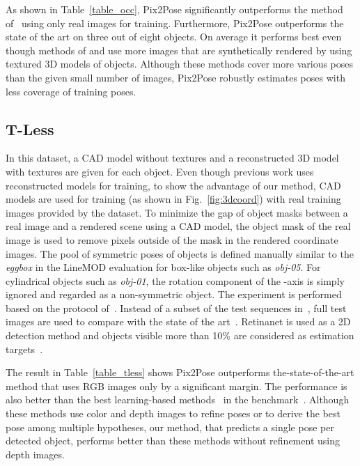 \documentclass[10pt,twocolumn,letterpaper]{article}
\begin{document}
As shown in Table~\ref{table_occ}, Pix2Pose significantly outperforms the method of~\cite{Tekin_2018_CVPR} using only real images for training. Furthermore, Pix2Pose outperforms the state of the art on three out of eight objects. On average it performs best even though methods of \cite{Oberweger_2018_ECCV_heatmap} and \cite{xiang2017posecnn} use more images that are synthetically rendered by using textured 3D models of objects. Although these methods cover more various poses than the given small number of images, Pix2Pose robustly estimates poses with less coverage of training poses.


\subsection{T-Less}
In this dataset, a CAD model without textures and a reconstructed 3D model with textures are given for each object. Even though previous work uses reconstructed models for training, to show the advantage of our method, CAD models are used for training (as shown in Fig.~\ref{fig:3dcoord}) with real training images provided by the dataset. To minimize the gap of object masks between a real image and a rendered scene using a CAD model, the object mask of the real image is used to remove pixels outside of the mask in the rendered coordinate images. The pool of symmetric poses  of objects is defined manually similar to the \textit{eggbox} in the LineMOD evaluation for box-like objects such as \textit{obj-05}. For cylindrical objects such as \textit{obj-01}, the rotation component of the -axis is simply ignored and regarded as a non-symmetric object. The experiment is performed based on the protocol of~\cite{Hodan_2018_ECCV_bop}. Instead of a subset of the test sequences in~\cite{Hodan_2018_ECCV_bop}, full test images are used to compare with the state of the art~\cite{Sundermeyer_2018_ECCV_implicit}. Retinanet is used as a 2D detection method and objects visible more than 10\% are considered as estimation targets~\cite{Hodan_2018_ECCV_bop,Sundermeyer_2018_ECCV_implicit}. 

The result in Table~\ref{table_tless} shows Pix2Pose outperforms the-state-of-the-art method that uses RGB images only by a significant margin. The performance is also better than the best learning-based methods~\cite{cnn_pose:brachmann2016uncertainty_only_rgb, kehl2016deep} in the benchmark~\cite{Hodan_2018_ECCV_bop}. Although these methods use color and depth images to refine poses or to derive the best pose among multiple hypotheses, our method, that predicts a single pose per detected object, performs better than these methods without refinement using depth images. 
\end{document}
